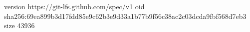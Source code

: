 version https://git-lfs.github.com/spec/v1
oid sha256:69ea899b3d17fdd85e9c62b3e9d33a1b77b9f56c38ac2c03dcda9fbf568d7eb3
size 43936
